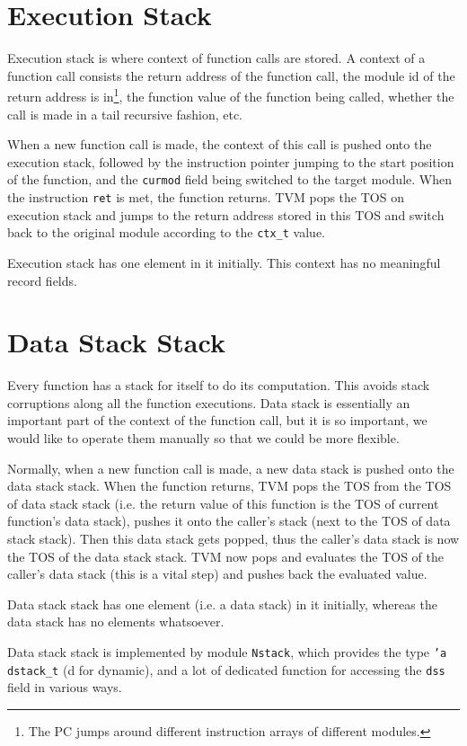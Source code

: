\documentclass{report}
\begin{document}
\section{Execution Stack}

Execution stack is where context of function calls are stored. A context of a function call consists the return address of the function call, the module id of the return address is in\footnote{The PC jumps around different instruction arrays of different modules.}, the function value of the function being called, whether the call is made in a tail recursive fashion, etc.

When a new function call is made, the context of this call is pushed onto the execution stack, followed by the instruction pointer jumping to the start position of the function, and the \texttt{curmod} field being switched to the target module. When the instruction \texttt{ret} is met, the function returns. TVM pops the TOS on execution stack and jumps to the return address stored in this TOS and switch back to the original module according to the \texttt{ctx\_t} value.

\begin{mdframed}[style=detail]
  Execution stack has one element in it initially. This context has no
  meaningful record fields.
\end{mdframed}

\section{Data Stack Stack}

Every function has a stack for itself to do its computation. This avoids stack corruptions along all the function executions. Data stack is essentially an important part of the context of the function call, but it is so important, we would like to operate them manually so that we could be more flexible.

Normally, when a new function call is made, a new data stack is pushed onto the data stack stack. When the function returns, TVM pops the TOS from the TOS of data stack stack (i.e. the return value of this function is the TOS of current function's data stack), pushes it onto the caller's stack (next to the TOS of data stack stack). Then this data stack gets popped, thus the caller's data stack is now the TOS of the data stack stack. TVM now pops and evaluates the TOS of the caller's data stack (this is a vital step) and pushes back the evaluated value.

\begin{mdframed}[style=detail]
  Data stack stack has one element (i.e. a data stack) in it
  initially, whereas the data stack has no elements whatsoever.

  Data stack stack is implemented by module \texttt{Nstack}, which
  provides the type \texttt{'a dstack\_t} (d for dynamic), and a lot
  of dedicated function for accessing the \texttt{dss} field in
  various ways.
\end{mdframed}
\end{document}
